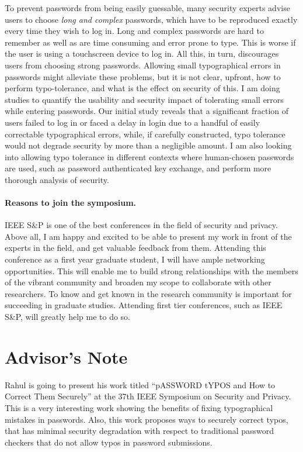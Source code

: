 \documentclass[11pt,a4paper,notitlepage]{article}
\begin{document}
To prevent passwords from being easily guessable, many security
experts advise users to choose {\em long and complex} passwords, which
have to be reproduced exactly every time they wish to log in. Long and
complex passwords are hard to remember as well as are time consuming
and error prone to type. This is worse if the user is using a
touchscreen device to log in. All this, in turn, discourages users
from choosing strong passwords.  Allowing small typographical errors
in passwords might alleviate these problems, but it is not clear,
upfront, how to perform typo-tolerance, and what is the effect on
security of this.  I am doing studies to quantify the usability and
security impact of tolerating small errors while entering
passwords. Our initial study reveals that a significant fraction of
users failed to log in or faced a delay in login due to a handful of
easily correctable typographical errors, while, if carefully
constructed, typo tolerance would not degrade security by more than a
negligible amount.  %
I am also looking into allowing typo tolerance in different contexts
where human-chosen passwords are used, such as password authenticated
key exchange, and perform more thorough analysis of security.
\\

\paragraph{Reasons to join the symposium.}
IEEE S\&P is one of the best conferences in the field of security and
privacy. Above all, I am happy and excited to be able to present my
work in front of the experts in the field, and get valuable feedback
from them.  Attending this conference as a first year graduate
student, I will have ample networking opportunities. This will enable
me to build strong relationships with the members of the vibrant
community and broaden my scope to collaborate with other
researchers. To know and get known in the research community is
important for succeeding in graduate studies. Attending first tier
conferences, such as IEEE S\&P, will greatly help me to do so.


\section{Advisor's Note}
Rahul is going to present his work titled ``pASSWORD tYPOS and How to
Correct Them Securely'' at the 37th IEEE Symposium on Security and
Privacy. This is a very interesting work showing the benefits of
fixing typographical mistakes in passwords. Also, this work proposes
ways to securely correct typos, that has minimal security degradation
with respect to traditional password checkers that do not allow typos
in password submissions.
\end{document}
